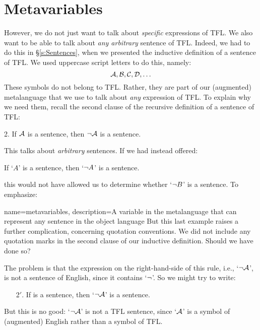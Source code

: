 \section{Metavariables}\label{s:Metavariables}
However, we do not just want to talk about \emph{specific} expressions of TFL. We also want to be able to talk about \emph{any arbitrary} sentence of TFL. Indeed, we had to do this in \S\ref{s:Sentences}, when we presented the inductive definition of a sentence of TFL. We used uppercase script letters to do this, namely:
	$$\mathcal{A}, \mathcal{B}, \mathcal{C}, \mathcal{D}, \ldots$$
These symbols do not belong to TFL. Rather, they are part of our (augmented) metalanguage that we use to talk about \emph{any} expression of TFL. To explain why we need them, recall the second clause of the recursive definition of a sentence of TFL:
	\begin{earg}
		\item[2.] If $\mathcal{A}$ is a sentence, then $\neg \mathcal{A}$ is a sentence.
	\end{earg}
This talks about \emph{arbitrary} sentences. If we had instead offered:
	\begin{ebullet}
		\item If `$A$' is a sentence, then `$\neg A$' is a sentence.
	\end{ebullet}
this would not have allowed us to determine whether `$\neg B$' is a sentence. To emphasize:

{
name=metavariables,
description={A variable in the metalanguage that can represent any sentence in the object language}
}
But this last example raises a further complication, concerning quotation conventions. We did not include any quotation marks in the second clause of our inductive definition. Should we have done so?

The problem is that the expression on the right-hand-side of this rule, i.e., `$\neg\mathcal{A}$', is not a sentence of English, since it contains `$\neg$'. So we might try to write:
	\begin{enumerate}
		\item[2$'$.] If  is a sentence, then `$\neg \mathcal{A}$' is a sentence.
	\end{enumerate}
But this is no good: `$\neg \mathcal{A}$' is not a TFL sentence, since `$\mathcal{A}$' is a symbol of (augmented) English rather than a symbol of TFL.

